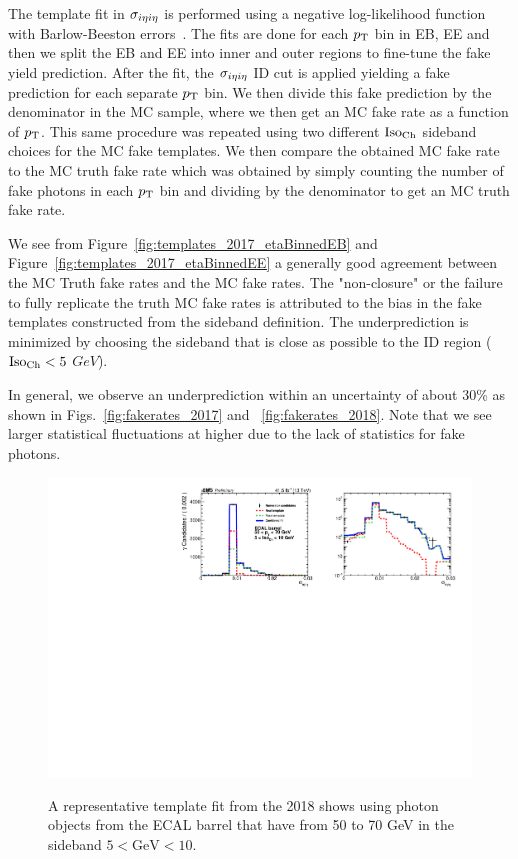 
The template fit in $\sigma_{i\eta i\eta}$ is performed using a negative log-likelihood function with Barlow-Beeston errors~\cite{BarlowBeeston:1993}. The fits are done for each $p_{\mathrm{T}}$ bin in EB, EE and then we split the EB and EE into inner and outer regions to fine-tune the fake yield prediction. After the fit, the $\sigma_{i\eta i\eta}$ ID cut is applied yielding a fake prediction for each separate $p_{\mathrm{T}}$ bin. We then divide this fake prediction by the denominator in the MC sample, where we then get an MC fake rate as a function of $p_{\mathrm{T}}$. This same procedure was repeated using two different $\text{Iso}_{\text{Ch}}$ sideband choices for the MC fake templates. We then compare the obtained MC fake rate to the MC truth fake rate which was obtained by simply counting the number of fake photons in each $p_{\mathrm{T}}$ bin and dividing by the denominator to get an MC truth fake rate.

We see from Figure~\ref{fig:templates_2017_etaBinnedEB} and Figure~\ref{fig:templates_2017_etaBinnedEE} a generally good agreement between the MC Truth fake rates and the MC fake rates. The "non-closure" or the failure to fully replicate the truth MC fake rates is attributed to the bias in the fake templates constructed from the sideband definition. The underprediction is minimized by choosing the sideband that is close as possible to the ID region ($\text{Iso}_{\text{Ch}} < 5$ $GeV$).

In general, we observe an underprediction within an uncertainty of about 30\% as shown in Figs.~\ref{fig:fakerates_2017} and ~\ref{fig:fakerates_2018}. Note that we see larger statistical fluctuations at higher \pt due to the lack of statistics for fake photons.

\begin{figure}[!htbp]
\caption{A representative template fit from the 2018 shows using photon objects from the ECAL barrel that have \pT from 50 to 70 GeV in the \chiso sideband $5 \mathopen< \text{GeV} < 10$.}
\centering
\includegraphics[scale=0.83]{fig/fakeRatePlot_all_2017_EB_pT50To70_chIso5To10.pdf}
\label{fig:templatefit_closure}
\end{figure}


